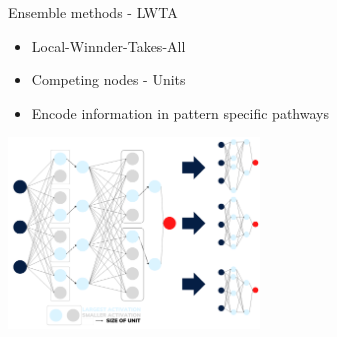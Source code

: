 \documentclass[UKenglish]{beamer}
\begin{document}

\begin{frame}{Ensemble methods - LWTA}
    \begin{itemize}
        \item Local-Winnder-Takes-All
        \item Competing nodes - Units
        \item Encode information in pattern specific pathways
    \end{itemize}    
    \centering
    \includegraphics[width = 0.5\textwidth]{figures/Max_out}
\end{frame}
\end{document}
